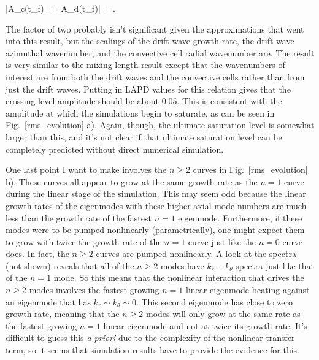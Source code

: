 \beq
\label{dw_cc_scaling}
|A_c(t_f)| = |A_d(t_f)| = .
\eeq

The factor of two probably isn't significant given the approximations that went into this result, but the scalings of the drift wave growth rate, the drift wave azimuthal wavenumber,
and the convective cell radial wavenumber are. The result is very similar to the mixing length result except that the wavenumbers of interest are from both the drift waves and the
convective cells rather than from just the drift waves. Putting in LAPD values for this relation gives that the crossing level amplitude should be about $0.05$. This is consistent
with the amplitude at which the simulations begin to saturate, as can be seen in Fig.~\ref{rms_evolution} a). Again, though, the ultimate saturation level is somewhat larger than this,
and it's not clear if that ultimate saturation level can be completely predicted without direct numerical simulation.

One last point I want to make involves the $n \ge 2$ curves in Fig.~\ref{rms_evolution} b). These curves all appear to grow at the same growth rate as the $n=1$ curve during the linear
stage of the simulation. This may seem odd because the linear growth rates of the eigenmodes with these higher axial mode numbers are much less than the growth rate of the fastest
$n=1$ eigenmode. Furthermore, if these modes were to be pumped nonlinearly (parametrically), one might expect them to grow with twice the growth rate of the $n=1$ curve just like the
$n=0$ curve does. In fact, the $n \ge 2$ curves are pumped nonlinearly. A look at the spectra (not shown) reveals that all of the $n \ge 2$ modes have $k_r-k_\theta$ spectra
just like that of the $n=1$ mode. So this means that the nonlinear interaction that drives the $n \ge 2$ modes involves the fastest growing $n=1$ linear eigenmode beating against an eigenmode
that has $k_r \sim k_\theta \sim 0$. This second eigenmode has close to zero growth rate, meaning that the $n \ge 2$ modes will only grow at the same rate as the fastest growing
$n=1$ linear eigenmode and not at twice its growth rate. It's difficult to guess this \emph{a priori} due to the complexity of the nonlinear transfer term, so it seems that simulation
results have to provide the evidence for this.
